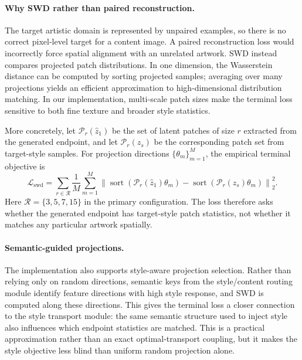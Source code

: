 ﻿\documentclass{article}
\begin{document}
\paragraph{Why SWD rather than paired reconstruction.}
The target artistic domain is represented by unpaired examples, so there is no correct pixel-level target for a content image. A paired reconstruction loss would incorrectly force spatial alignment with an unrelated artwork. SWD instead compares projected patch distributions. In one dimension, the Wasserstein distance can be computed by sorting projected samples; averaging over many projections yields an efficient approximation to high-dimensional distribution matching. In our implementation, multi-scale patch sizes make the terminal loss sensitive to both fine texture and broader style statistics.

More concretely, let $\mathcal{P}_r(\hat{z}_1)$ be the set of latent patches of size $r$ extracted from the generated endpoint, and let $\mathcal{P}_r(z_s)$ be the corresponding patch set from target-style samples. For projection directions $\{\theta_m\}_{m=1}^M$, the empirical terminal objective is
\begin{equation}
    \mathcal{L}_{\mathrm{swd}} =
    \sum_{r\in\mathcal{R}} \frac{1}{M}
    \sum_{m=1}^{M}
    \left\|
    \operatorname{sort}(\mathcal{P}_r(\hat{z}_1)\theta_m) -
    \operatorname{sort}(\mathcal{P}_r(z_s)\theta_m)
    \right\|_2^2 .
\end{equation}
Here $\mathcal{R}=\{3,5,7,15\}$ in the primary configuration. The loss therefore asks whether the generated endpoint has target-style patch statistics, not whether it matches any particular artwork spatially.

\paragraph{Semantic-guided projections.}
The implementation also supports style-aware projection selection. Rather than relying only on random directions, semantic keys from the style/content routing module identify feature directions with high style response, and SWD is computed along these directions. This gives the terminal loss a closer connection to the style transport module: the same semantic structure used to inject style also influences which endpoint statistics are matched. This is a practical approximation rather than an exact optimal-transport coupling, but it makes the style objective less blind than uniform random projection alone.
\end{document}
